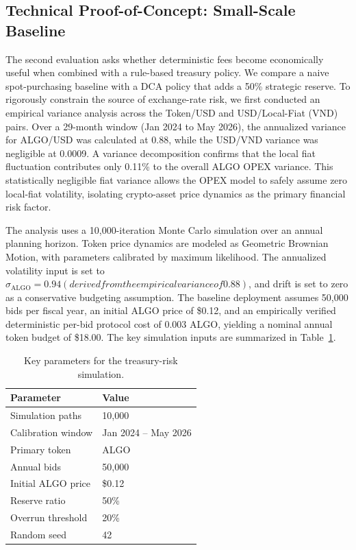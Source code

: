 \documentclass[runningheads]{llncs}
\begin{document}
\subsection{Technical Proof-of-Concept: Small-Scale Baseline}

The second evaluation asks whether deterministic fees become economically useful
when combined with a rule-based treasury policy. We compare a naive
spot-purchasing baseline with a DCA policy that adds a 50\% strategic reserve.
To rigorously constrain the source of exchange-rate risk, we first conducted an
empirical variance analysis across the Token/USD and USD/Local-Fiat (VND) pairs.
Over a 29-month window (Jan 2024 to May 2026), the annualized variance for 
ALGO/USD was calculated at 0.88, while the USD/VND variance was negligible at 0.0009. 
A variance decomposition confirms that the local fiat fluctuation contributes 
only 0.11\% to the overall ALGO OPEX variance. This statistically negligible fiat variance allows the 
OPEX model to safely assume zero local-fiat volatility, isolating crypto-asset 
price dynamics as the primary financial risk factor.

The analysis uses a 10{,}000-iteration Monte Carlo simulation over an annual
planning horizon. Token price dynamics are modeled as Geometric Brownian
Motion, with parameters calibrated by maximum likelihood. The annualized volatility
input is set to $\sigma_{\text{ALGO}}=0.94 (derived from the empirical variance of 0.88)$, and drift is set to
zero as a conservative budgeting assumption. The baseline deployment assumes
50{,}000 bids per fiscal year, an initial ALGO price of \$0.12, and an empirically verified deterministic
per-bid protocol cost of 0.003 ALGO, yielding a nominal annual token budget
of \$18.00. The key simulation inputs are summarized in
Table~\ref{tab:sim-params}.

\begin{table}[t]
\caption{Key parameters for the treasury-risk simulation.}
\label{tab:sim-params}
\centering
\begin{tabular}{ll}
\hline
Parameter & Value \\
\hline
Simulation paths & 10{,}000 \\
Calibration window & Jan 2024 -- May 2026 \\
Primary token & ALGO \\
Annual bids & 50{,}000 \\
Initial ALGO price & \$0.12 \\
Reserve ratio & 50\% \\
Overrun threshold & 20\% \\
Random seed & 42 \\
\hline
\end{tabular}
\end{table}
\end{document}
